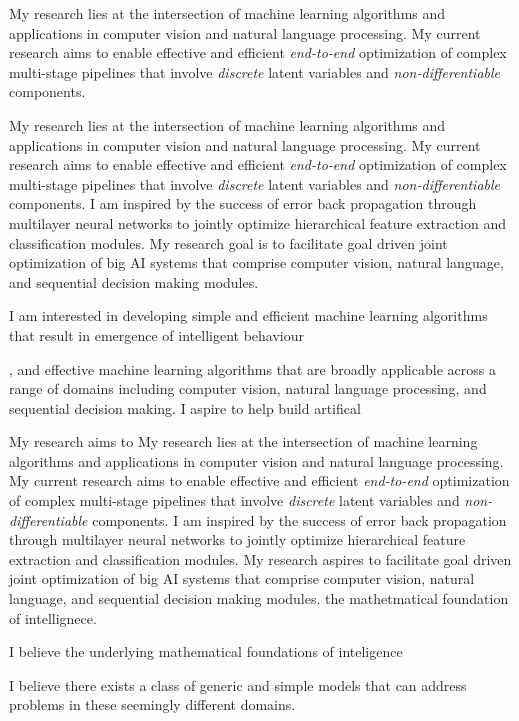 \documentclass[a4paper, 10pt]{article}
\begin{document}
My research lies at the intersection of machine learning algorithms
and applications in computer vision and natural language processing.
My current research aims to enable effective and efficient {\em
  end-to-end} optimization of complex multi-stage pipelines that
involve {\em discrete} latent variables and {\em non-differentiable}
components. 


My research lies at the intersection of machine learning algorithms
and applications in computer vision and natural language processing.
My current research aims to enable effective and efficient {\em
  end-to-end} optimization of complex multi-stage pipelines that
involve {\em discrete} latent variables and {\em non-differentiable}
components.  I am inspired by the success of error back propagation
through multilayer neural networks to jointly optimize hierarchical
feature extraction and classification modules. My research goal is to
facilitate goal driven joint optimization of big AI systems that
comprise computer vision, natural language, and sequential decision
making modules.

I am interested in developing simple and efficient machine learning
algorithms that result in emergence of intelligent behaviour 


, and effective machine learning
algorithms that are broadly applicable across a range of domains
including computer vision, natural language processing, and sequential
decision making. I aspire to help build artifical


My research aims to My research lies at the intersection of machine learning algorithms
and applications in computer vision and natural language processing.
My current research aims to enable effective and efficient {\em                                                                                            
  end-to-end} optimization of complex multi-stage pipelines that
involve {\em discrete} latent variables and {\em non-differentiable}
components.  I am inspired by the success of error back propagation
through multilayer neural networks to jointly optimize hierarchical
feature extraction and classification modules. My research aspires
to facilitate goal driven joint optimization of big AI systems that
comprise computer vision, natural language, and sequential decision
making modules. the mathetmatical foundation of intellignece.



I believe the underlying mathematical
foundations of inteligence  


 I believe there exists a class of generic and
simple models that can address problems in these seemingly different
domains.
\end{document}
